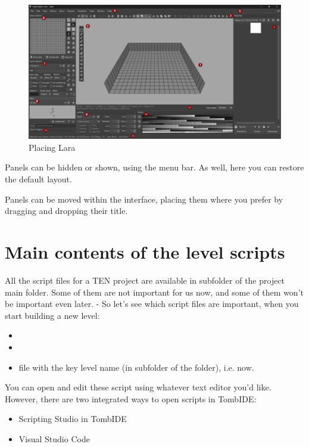 \begin{figure}
    \centering
     \includegraphics[width=1\textwidth]{screenshots/2025-08-23 17_29_21-Tomb Editor 1.9.2 - Test1.png}
     \caption{Placing Lara}
     \label{fig:TEUI} 
\end{figure}

Panels can be hidden or shown, using the  menu bar. As well, here you can restore the default layout.
\par Panels can be moved within the interface, placing them where you prefer by dragging and dropping their title.


\chapter{Main contents of the level scripts}
All the script files for a TEN project are available in  subfolder of the project main folder.
Some of them are not important for us now, and some of them won't be important even later. - So let's see which script files are important, when you start building a new level:
\begin{itemize}
    \item {}
    \item {}
    \item {} file with the key level name (in  subfolder of the  folder), i.e.  now.
\end{itemize}

You can open and edit these script using whatever text editor you'd like. However, there are two integrated ways to open scripts in TombIDE:
\begin{itemize}
    \item Scripting Studio in TombIDE
    \item Visual Studio Code
\end{itemize}

